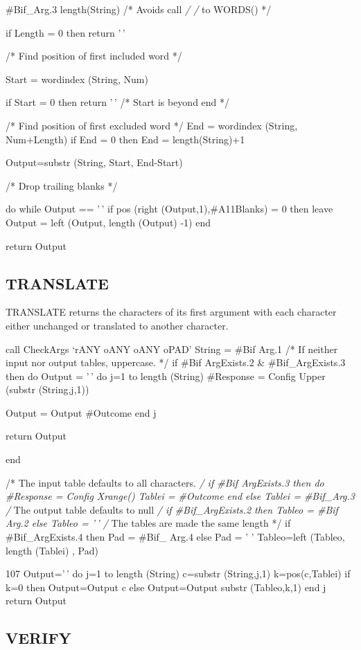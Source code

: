 \#Bif\_Arg.3 length(String) /* Avoids call \emph{/ /} to WORDS() */

if Length = 0 then return '\,'

/* Find position of first included word */

Start = wordindex (String, Num)

if Start = 0 then return '\,' /* Start is beyond end */

/* Find position of first excluded word */ End = wordindex (String,
Num+Length) if End = 0 then End = length(String)+1

Output=substr (String, Start, End-Start)

/* Drop trailing blanks */

do while Output == '\,' if pos (right (Output,1),\#A11Blanks) = 0 then
leave Output = left (Output, length (Output) -1) end

return Output

\subsection{TRANSLATE}\label{translate}

TRANSLATE returns the characters of its first argument with each
character either unchanged or translated to another character.

call CheckArgs `rANY oANY oANY oPAD' String = \#Bif Arg.1 /* If neither
input nor output tables, uppercase. */ if \#Bif ArgExists.2 \&
\#Bif\_ArgExists.3 then do Output = '\,' do j=1 to length (String)
\#Response = Config Upper (substr (String,j,1))

Output = Output \textbar\textbar{} \#Outcome end j

return Output

end

/* The input table defaults to all characters. \emph{/ if \#Bif
ArgExists.3 then do \#Response = Config Xrange() Tablei = \#Outcome end
else Tablei = \#Bif\_Arg.3 /} The output table defaults to null \emph{/
if \#Bif\_ArgExists.2 then Tableo = \#Bif Arg.2 else Tableo = '\,' /}
The tables are made the same length */ if \#Bif\_ArgExists.4 then Pad =
\#Bif\_ Arg.4 else Pad = ' ' Tableo=left (Tableo, length (Tablei) , Pad)

107 Output='\,' do j=1 to length (String) c=substr (String,j,1)
k=pos(c,Tablei) if k=0 then Output=Output \textbar\textbar c else
Output=Output \textbar{} \textbar{} substr (Tableo,k,1) end j return
Output

\subsection{VERIFY}\label{verify}


